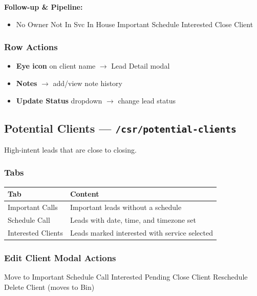 \documentclass[11pt,a4paper]{article}
\begin{document}
\textbf{Follow-up \& Pipeline:}
\begin{itemize}[noitemsep]
    \item No Owner \textbar{} Not In Svc \textbar{} In House \textbar{} Important \textbar{} Schedule \textbar{} Interested \textbar{} Close Client
\end{itemize}

\subsubsection{Row Actions}
\begin{itemize}[noitemsep]
    \item \textbf{Eye icon} on client name $\rightarrow$ Lead Detail modal
    \item \textbf{Notes} $\rightarrow$ add/view note history
    \item \textbf{Update Status} dropdown $\rightarrow$ change lead status
\end{itemize}

\subsection{Potential Clients --- \texttt{/csr/potential-clients}}

High-intent leads that are close to closing.

\subsubsection{Tabs}
\begin{longtable}{@{}p{4cm}p{10cm}@{}}
\toprule
\textbf{Tab} & \textbf{Content} \\
\midrule
Important Calls     & Important leads without a schedule \\
Schedule Call       & Leads with date, time, and timezone set \\
Interested Clients  & Leads marked interested with service selected \\
\bottomrule
\end{longtable}

\subsubsection{Edit Client Modal Actions}
Move to Important \textbar{} Schedule Call \textbar{} Interested \textbar{} Pending \textbar{} Close Client \textbar{} Reschedule \textbar{} Delete Client (moves to Bin)
\end{document}
